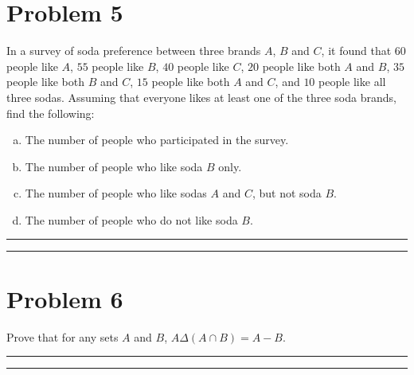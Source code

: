 \documentclass{article}
\theoremstyle{definition}
\newenvironment{solution}{\bigskip\hrule{\hfill}}{\bigskip\hrule{\hfill}} %
\begin{document}

\newpage


\section*{Problem 5}
In a survey of soda preference between three brands $A$, $B$ and $C$, it found that $60$ people like $A$, $55$ people like $B$, $40$ people like $C$, $20$ people like both $A$ and $B$, $35$ people like both $B$ and $C$, $15$ people like both $A$ and $C$, and $10$ people like all three sodas. Assuming that everyone likes at least one of the three soda brands, find the following:
\begin{enumerate}[a)] %
    \item The number of people who participated in the survey.
    \item The number of people who like soda $B$ only.
    \item The number of people who like sodas $A$ and $C$, but not soda $B$.
    \item The number of people who do not like soda $B$.
\end{enumerate}
\begin{solution}


\end{solution}


\newpage


\section*{Problem 6}
Prove that for any sets $A$ and $B$, $A\Delta\left(A\cap B\right)=A-B$.
\begin{solution}


\end{solution}
\end{document}
